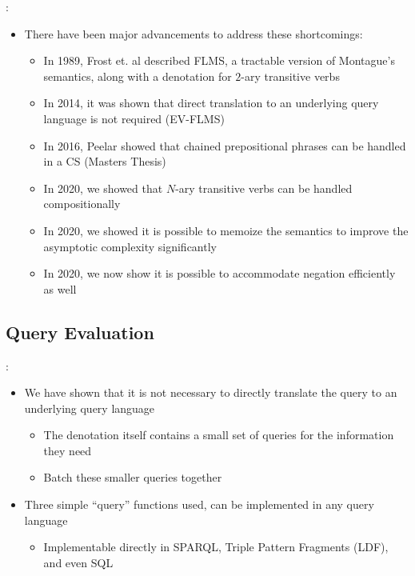 \documentclass[logoontitle,tabu,supertabular,aspectratio=43]{preney-uwindsor-beamer}
\begin{document}
	\begin{frame}{\insertsection: \insertsubsection}
		\begin{itemize}
			\item There have been major advancements to address these shortcomings:
			\begin{itemize}
			\item In 1989, Frost et. al described FLMS, a tractable version of Montague's semantics, along with a denotation for $2$-ary transitive verbs \cite{frost1989constructing}
			\item In 2014, it was shown that direct translation to an underlying query language is not required (EV-FLMS) \cite{frost2014denotational}
			\item In 2016, Peelar showed that chained prepositional phrases can be handled in a CS (Masters Thesis) \cite{peelar2016accommodating}
			\item In 2020, we showed that $N$-ary transitive verbs can be handled compositionally \cite{peelar2020compositional}
            \item In 2020, we showed it is possible to memoize the semantics to improve the asymptotic complexity significantly \cite{peelar2020webistjournal}
            \item In 2020, we now show it is possible to accommodate negation efficiently as well
			\end{itemize}
		\end{itemize}
	\end{frame}

    \subsection{Query Evaluation}
	\begin{frame}{\insertsection: \insertsubsection}
		\begin{itemize}
			\item We have shown that it is not necessary to directly translate the query to an underlying query language \cite{frost2014demonstration}
			\begin{itemize}
				\item The denotation itself contains a small set of queries for the information they need
				\item Batch these smaller queries together
			\end{itemize}
			\item Three simple ``query'' functions used, can be implemented in any query language
			\begin{itemize}
				\item Implementable directly in SPARQL, Triple Pattern Fragments (LDF), and even SQL
			\end{itemize}
		\end{itemize}
	\end{frame}
\end{document}
